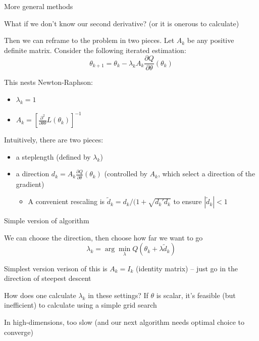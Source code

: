 \documentclass[notes,11pt, aspectratio=169]{beamer}
\newenvironment{wideitemize}{\itemize\addtolength{\itemsep}{10pt}}{\enditemize}
\begin{document}
  \begin{frame}{More general methods}
    \begin{wideitemize}
    \item What if we don't know our second derivative? (or it is onerous to
    calculate)
    \item Then we can reframe to the problem in two pieces.  Let $A_{k}$ be
    any positive definite matrix. Consider the following iterated estimation:
    $$ \theta_{k+1} = \theta_{k} - \lambda_{k}A_{k}\frac{\partial Q}{\partial\theta}(\theta_{k})$$

  \item    This nests Newton-Raphson:
    \begin{itemize}
    \item $\lambda_{k} = 1$
    \item $A_{k} = \left[\frac{\partial^{2}}{\partial\theta \theta}L(\theta_{k})\right]^{-1}$
    \end{itemize}

  \item    Intuitively, there are two pieces:
    \begin{itemize}
    \item  a steplength (defined by $\lambda_{k}$)
    \item a direction
      $d_{k} = A_{k}\frac{\partial Q}{\partial\theta}(\theta_{k})$
      (controlled by $A_{k}$, which select a direction of the
      gradient)
      \begin{itemize}
      \item A convenient rescaling is $\tilde{d}_{k} = d_{k} / (1 + \sqrt{d_{k}'d_{k}}$ to ensure $|\tilde{d}_{k}| < 1$
      \end{itemize}
    \end{itemize}
    \end{wideitemize}
  \end{frame}
  \begin{frame}{Simple version of algorithm}
    \begin{wideitemize}
    \item We can choose the direction, then choose how far we want to go
      $$\lambda_{k} = \arg\min_{\lambda}Q(\theta_{k} + \lambda \tilde{d}_{k})   $$
    \item Simplest version verison of this is $A_{k} = I_{k}$
      (identity matrix) -- just go in the direction of steepest
      descent
    \item How does one calculate $\lambda_{k}$ in these settings? If
      $\theta$ is scalar, it's feasible (but inefficient) to calculate
      using a simple grid search 
    \item In high-dimensions, too slow (and our next algorithm needs
      optimal choice to converge)
    \end{wideitemize}
  \end{frame}
\end{document}
